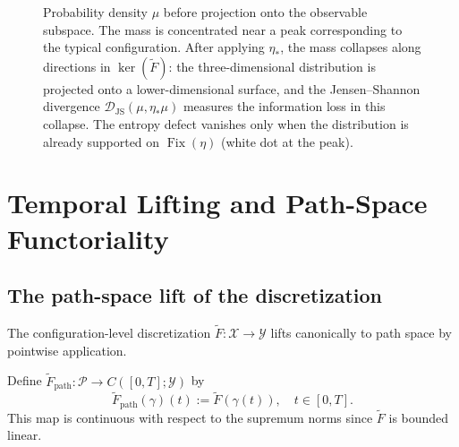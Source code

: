 \documentclass[12pt, oneside]{memoir}
\DeclareMathOperator{\Fix}{Fix}
\newcommand{\X}{\mathcal{X}}
\newcommand{\PP}{\mathcal{P}}
\newcommand{\Ft}{\widetilde{F}}
\newcommand{\Fpath}{\widetilde{F}_{\mathrm{path}}}
\newcommand{\Djs}{\mathcal{D}_{\mathrm{JS}}}
\begin{document}
\begin{figure}[htbp]
\centering
{}
\caption{Probability density $\mu$ before projection onto the observable subspace.
The mass is concentrated near a peak corresponding to the typical configuration.
After applying $\eta_*$, the mass collapses along directions in $\ker(\Ft)$: the
three-dimensional distribution is projected onto a lower-dimensional surface, and
the Jensen--Shannon divergence $\Djs(\mu, \eta_*\mu)$ measures the
information loss in this collapse.  The entropy defect vanishes only when the
distribution is already supported on $\Fix(\eta)$ (white dot at the peak).}
\label{fig:gaussian-measure}
\end{figure}

\chapter{Temporal Lifting and Path-Space Functoriality}
\label{ch:temporal}

\section{The path-space lift of the discretization}

The configuration-level discretization $\Ft: \X \to \mathcal{Y}$ lifts canonically to
path space by pointwise application.

\begin{definition}
\label{def:Fpath}
Define $\Fpath: \PP \to C([0,T];\mathcal{Y})$ by
\[
  \Fpath(\gamma)(t) := \Ft(\gamma(t)), \quad t \in [0,T].
\]
This map is continuous with respect to the supremum norms since $\Ft$ is bounded linear.
\end{definition}
\end{document}

